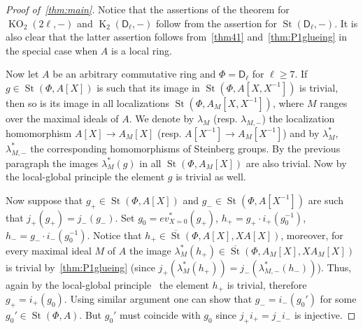 \documentclass[10pt,a4paper,twoside]{article}
\theoremstyle{remark}
\theoremstyle{definition}
\numberwithin{lemma}{section}
\numberwithin{prop}{section}
\numberwithin{corollary}{section}
\numberwithin{externaltheorem}{section}
\DeclareMathOperator{\St}{St}
\DeclareMathOperator{\K}{K}
\DeclareMathOperator{\KO}{KO}
\newcommand{\inv}{^{-1}}
\newcommand{\rD}{\mathsf{D}}
\numberwithin{equation}{section}
\begin{document}
\begin{proof}[Proof of~\cref{thm:main}]
 Notice that the assertions of the theorem for $\KO_2(2\ell, -)$ and $\K_2(\rD_\ell, -)$ follow from the assertion for $\St(\rD_\ell, -)$. It is also clear that the latter assertion follows from~\cref{thm41} and~\cref{thm:P1glueing} in the special case when $A$ is a local ring.
 
 Now let $A$ be an arbitrary commutative ring and $\Phi = \rD_\ell$ for $\ell \geq 7$. If $g \in \St(\Phi, A[X])$ is such that its image in $\St(\Phi, A[X, X\inv])$ is trivial, then so is its image in all localizations $\St(\Phi, A_M[X, X\inv])$, where $M$ ranges over the maximal ideals of $A$.
 We denote by $\lambda_{M}$ (resp. $\lambda_{M, -}$) the localization homomorphism $A[X] \to A_M[X]$ (resp. $A[X\inv] \to A_M[X\inv]$) and by $\lambda_M^*$, $\lambda_{M,-}^*$ the corresponding homomorphisms of Steinberg groups.
 By the previous paragraph the images $\lambda^*_M(g)$ in all $\St(\Phi, A_M[X])$ are also trivial. Now by the local-global principle \cite[Theorem~2]{LS17} the element $g$ is trivial as well.

 Now suppose that $g_+ \in \St(\Phi, A[X])$ and $g_- \in \St(\Phi, A[X\inv])$ are such that $j_+(g_+) = j_-(g_-)$. Set $g_0 = ev^*_{X=0}(g_+)$, $h_+ = g_+ \cdot i_+(g_0^{-1})$, $h_- = g_- \cdot i_-(g_0^{-1})$.
 Notice that $h_+ \in \overline{\St}(\Phi, A[X], XA[X])$, moreover, for every maximal ideal $M$ of $A$ the image $\lambda_M^*(h_+)\in \overline{\St}(\Phi, A_M[X], XA_M[X])$ is trivial by~\cref{thm:P1glueing}
  (since $j_+(\lambda^*_M(h_+)) = j_-(\lambda^*_{M,-}(h_-))$).
 Thus, again by the local-global principle~\cite[Theorem~2]{LS17} the element $h_+$ is trivial, therefore $g_+ = i_+(g_0)$.
 Using similar argument one can show that $g_- = i_-(g_0')$ for some $g_0' \in \St(\Phi, A)$. But $g_0'$ must coincide with $g_0$ since $j_+i_+ = j_-i_-$ is injective.
\end{proof}
\end{document}
